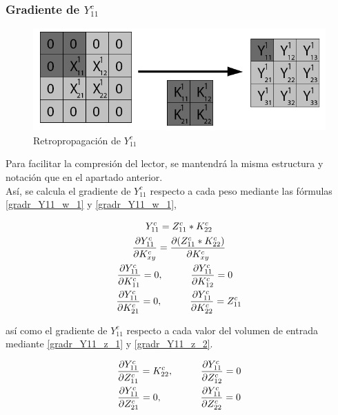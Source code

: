 \subsubsection{Gradiente de $Y^c_{11}$}

\begin{figure}[H]
	\centering
	\includegraphics[width=0.8\linewidth]{imagenes/conv_back_padding_1.jpg} 
	\caption{Retropropagación de $Y^c_{11}$}
\end{figure}

Para facilitar la compresión del lector, se mantendrá la misma estructura y notación que en el apartado anterior. \\
Así, se calcula el gradiente de $Y^c_{11}$ respecto a cada peso mediante las fórmulas \ref{gradr_Y11_w_1} y \ref{gradr_Y11_w_1},

\begin{gather}
	Y^c_{11} = Z^c_{11} * K^c_{22} \\
	\frac{\partial Y^c_{11}}{\partial K^c_{xy}} = \frac{\partial (Z^c_{11} * K^c_{22})}{\partial K^c_{xy}} \\
	\frac{\partial Y^c_{11}}{\partial K^c_{11}} = 0, \hspace{10mm} \frac{\partial Y^c_{11}}{\partial K^c_{12}} = 0 \hspace{3mm} \label{gradr_Y11_w_1} \\
	\frac{\partial Y^c_{11}}{\partial K^c_{21}} = 0, \hspace{10mm} \frac{\partial Y^c_{11}}{\partial K^c_{22}} = Z^c_{11} \label{gradr_Y11_w_2}
\end{gather}

así como el gradiente de $Y^c_{11}$ respecto a cada valor del volumen de entrada mediante \ref{gradr_Y11_z_1} y \ref{gradr_Y11_z_2}.

\begin{gather}
	\frac{\partial Y^c_{11}}{\partial Z^c_{11}} = K^c_{22}, \hspace{10mm} \frac{\partial Y^c_{11}}{\partial Z^c_{12}} = 0 \label{gradr_Y11_z_1} \\
	\frac{\partial Y^c_{11}}{\partial Z^c_{21}} = 0, \hspace{14mm} \frac{\partial Y^c_{11}}{\partial Z^c_{22}} = 0 \label{gradr_Y11_z_2}
\end{gather}


